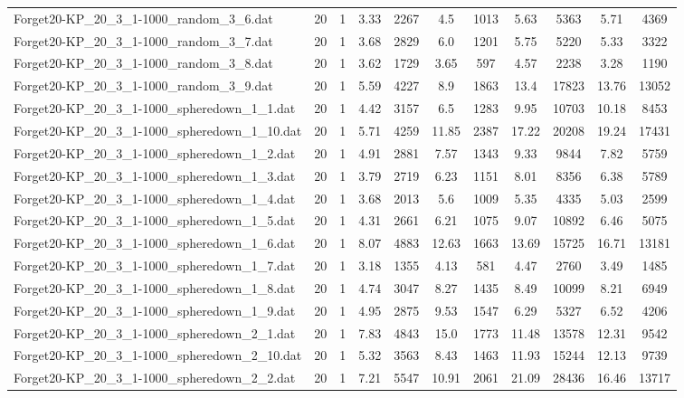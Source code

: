 \begin{table}[!ht]
\begin{tabular}{lcccccccccc}
Forget20-KP\_20\_3\_1-1000\_random\_3\_6.dat & 20 & 1 & 3.33 & 2267 & 4.5 & 1013 & 5.63 & 5363 & 5.71 & 4369 \\
Forget20-KP\_20\_3\_1-1000\_random\_3\_7.dat & 20 & 1 & 3.68 & 2829 & 6.0 & 1201 & 5.75 & 5220 & 5.33 & 3322 \\
Forget20-KP\_20\_3\_1-1000\_random\_3\_8.dat & 20 & 1 & 3.62 & 1729 & 3.65 & 597 & 4.57 & 2238 & 3.28 & 1190 \\
Forget20-KP\_20\_3\_1-1000\_random\_3\_9.dat & 20 & 1 & 5.59 & 4227 & 8.9 & 1863 & 13.4 & 17823 & 13.76 & 13052 \\
Forget20-KP\_20\_3\_1-1000\_spheredown\_1\_1.dat & 20 & 1 & 4.42 & 3157 & 6.5 & 1283 & 9.95 & 10703 & 10.18 & 8453 \\
Forget20-KP\_20\_3\_1-1000\_spheredown\_1\_10.dat & 20 & 1 & 5.71 & 4259 & 11.85 & 2387 & 17.22 & 20208 & 19.24 & 17431 \\
Forget20-KP\_20\_3\_1-1000\_spheredown\_1\_2.dat & 20 & 1 & 4.91 & 2881 & 7.57 & 1343 & 9.33 & 9844 & 7.82 & 5759 \\
Forget20-KP\_20\_3\_1-1000\_spheredown\_1\_3.dat & 20 & 1 & 3.79 & 2719 & 6.23 & 1151 & 8.01 & 8356 & 6.38 & 5789 \\
Forget20-KP\_20\_3\_1-1000\_spheredown\_1\_4.dat & 20 & 1 & 3.68 & 2013 & 5.6 & 1009 & 5.35 & 4335 & 5.03 & 2599 \\
Forget20-KP\_20\_3\_1-1000\_spheredown\_1\_5.dat & 20 & 1 & 4.31 & 2661 & 6.21 & 1075 & 9.07 & 10892 & 6.46 & 5075 \\
Forget20-KP\_20\_3\_1-1000\_spheredown\_1\_6.dat & 20 & 1 & 8.07 & 4883 & 12.63 & 1663 & 13.69 & 15725 & 16.71 & 13181 \\
Forget20-KP\_20\_3\_1-1000\_spheredown\_1\_7.dat & 20 & 1 & 3.18 & 1355 & 4.13 & 581 & 4.47 & 2760 & 3.49 & 1485 \\
Forget20-KP\_20\_3\_1-1000\_spheredown\_1\_8.dat & 20 & 1 & 4.74 & 3047 & 8.27 & 1435 & 8.49 & 10099 & 8.21 & 6949 \\
Forget20-KP\_20\_3\_1-1000\_spheredown\_1\_9.dat & 20 & 1 & 4.95 & 2875 & 9.53 & 1547 & 6.29 & 5327 & 6.52 & 4206 \\
Forget20-KP\_20\_3\_1-1000\_spheredown\_2\_1.dat & 20 & 1 & 7.83 & 4843 & 15.0 & 1773 & 11.48 & 13578 & 12.31 & 9542 \\
Forget20-KP\_20\_3\_1-1000\_spheredown\_2\_10.dat & 20 & 1 & 5.32 & 3563 & 8.43 & 1463 & 11.93 & 15244 & 12.13 & 9739 \\
Forget20-KP\_20\_3\_1-1000\_spheredown\_2\_2.dat & 20 & 1 & 7.21 & 5547 & 10.91 & 2061 & 21.09 & 28436 & 16.46 & 13717 \\

\end{tabular}
\end{table}
